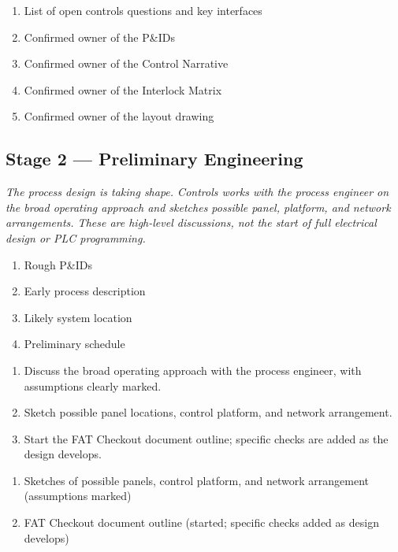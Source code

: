 \begin{enumerate}[itemsep=1pt]
  \item List of open controls questions and key interfaces
  \item Confirmed owner of the P\&IDs
  \item Confirmed owner of the Control Narrative
  \item Confirmed owner of the Interlock Matrix
  \item Confirmed owner of the layout drawing
\end{enumerate}

\subsection{Stage 2 --- Preliminary Engineering}
\textit{The process design is taking shape. Controls works with the process engineer on the broad operating approach and sketches possible panel, platform, and network arrangements. These are high-level discussions, not the start of full electrical design or PLC programming.}

\begin{enumerate}[itemsep=1pt]
  \item Rough P\&IDs
  \item Early process description
  \item Likely system location
  \item Preliminary schedule
\end{enumerate}

\begin{enumerate}[itemsep=1pt]
  \item Discuss the broad operating approach with the process engineer, with assumptions clearly marked.
  \item Sketch possible panel locations, control platform, and network arrangement.
  \item Start the FAT Checkout document outline; specific checks are added as the design develops.
\end{enumerate}

\begin{enumerate}[itemsep=1pt]
  \item Sketches of possible panels, control platform, and network arrangement (assumptions marked)
  \item FAT Checkout document outline (started; specific checks added as design develops)
\end{enumerate}

